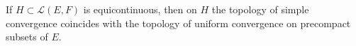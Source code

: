 If $H \subset \mathcal{L}(E, F)$ is equicontinuous, then on $H$ the topology of simple convergence coincides with the topology of uniform convergence on precompact subsets of $E$.

